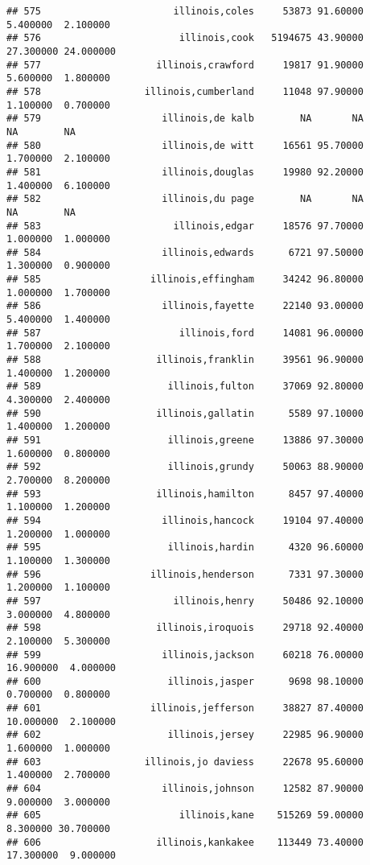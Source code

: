 \documentclass[
]{article}
\begin{document}
\begin{verbatim}
## 575                       illinois,coles     53873 91.60000  5.400000  2.100000
## 576                        illinois,cook   5194675 43.90000 27.300000 24.000000
## 577                    illinois,crawford     19817 91.90000  5.600000  1.800000
## 578                  illinois,cumberland     11048 97.90000  1.100000  0.700000
## 579                     illinois,de kalb        NA       NA        NA        NA
## 580                     illinois,de witt     16561 95.70000  1.700000  2.100000
## 581                     illinois,douglas     19980 92.20000  1.400000  6.100000
## 582                     illinois,du page        NA       NA        NA        NA
## 583                       illinois,edgar     18576 97.70000  1.000000  1.000000
## 584                     illinois,edwards      6721 97.50000  1.300000  0.900000
## 585                   illinois,effingham     34242 96.80000  1.000000  1.700000
## 586                     illinois,fayette     22140 93.00000  5.400000  1.400000
## 587                        illinois,ford     14081 96.00000  1.700000  2.100000
## 588                    illinois,franklin     39561 96.90000  1.400000  1.200000
## 589                      illinois,fulton     37069 92.80000  4.300000  2.400000
## 590                    illinois,gallatin      5589 97.10000  1.400000  1.200000
## 591                      illinois,greene     13886 97.30000  1.600000  0.800000
## 592                      illinois,grundy     50063 88.90000  2.700000  8.200000
## 593                    illinois,hamilton      8457 97.40000  1.100000  1.200000
## 594                     illinois,hancock     19104 97.40000  1.200000  1.000000
## 595                      illinois,hardin      4320 96.60000  1.100000  1.300000
## 596                   illinois,henderson      7331 97.30000  1.200000  1.100000
## 597                       illinois,henry     50486 92.10000  3.000000  4.800000
## 598                    illinois,iroquois     29718 92.40000  2.100000  5.300000
## 599                     illinois,jackson     60218 76.00000 16.900000  4.000000
## 600                      illinois,jasper      9698 98.10000  0.700000  0.800000
## 601                   illinois,jefferson     38827 87.40000 10.000000  2.100000
## 602                      illinois,jersey     22985 96.90000  1.600000  1.000000
## 603                  illinois,jo daviess     22678 95.60000  1.400000  2.700000
## 604                     illinois,johnson     12582 87.90000  9.000000  3.000000
## 605                        illinois,kane    515269 59.00000  8.300000 30.700000
## 606                    illinois,kankakee    113449 73.40000 17.300000  9.000000

\end{verbatim}
\end{document}
